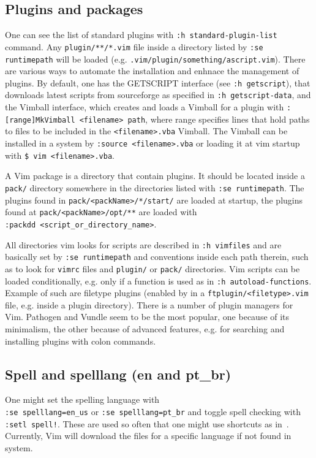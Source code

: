 \documentclass{article}
\newcommand{\tttt}[1]{\texttt{#1}}
\begin{document}
\subsection{Plugins and packages}
One can see the list of standard plugins
with \tttt{:h standard-plugin-list} command.
Any \tttt{plugin/**/*.vim} file inside a directory
listed by \tttt{:se runtimepath} will be loaded
(e.g. \tttt{.vim/plugin/something/ascript.vim}).
There are various ways to automate the installation
and enhnace the management of plugins.
By default, one has the GETSCRIPT interface (see \tttt{:h getscript}),
that downloads latest scripts from sourceforge as specified in \tttt{:h getscript-data},
and the Vimball interface, which creates and loads a Vimball for a plugin
with \tttt{:[range]MkVimball <filename> path}, where range specifies lines
that hold paths to files to be included in the \tttt{<filename>.vba} Vimball.
The Vimball can be installed in a system by \tttt{:source <filename>.vba}
or loading it at vim startup with \tttt{\$ vim <filename>.vba}.

A Vim package is a directory that contain plugins.
It should be located inside a \tttt{pack/} directory
somewhere in the directories listed with \tttt{:se runtimepath}.
The plugins found in \tttt{pack/<packName>/*/start/} are loaded
at startup, the plugins found at
\tttt{pack/<packName>/opt/**} are loaded with\\
\tttt{:packdd <script\_or\_directory\_name>}.

All directories vim looks for scripts are described
in \tttt{:h vimfiles} and are basically set by
\tttt{:se runtimepath} and conventions inside
each path therein, such as to look for \tttt{vimrc} files
and \tttt{plugin/} or \tttt{pack/} directories.
Vim scripts can be loaded conditionally,
e.g. only if a function is used as in \tttt{:h autoload-functions}.
Example of such are filetype plugins (enabled by in a \tttt{ftplugin/<filetype>.vim} file,
e.g. inside a plugin directory).
There is a number of plugin managers for Vim.
Pathogen and Vundle seem to be the most popular,
one because of its minimalism, the other because of
advanced features, e.g. for searching and installing plugins with
colon commands.

\subsection{Spell and spelllang (en and pt\_br)}
One might set the spelling language with\\ \tttt{:se spelllang=en\_us}
or \tttt{:se spelllang=pt\_br}
and toggle spell checking with \tttt{:setl spell!}.
These are used so often that one might use shortcuts as in~\cite{vimrc}.
Currently, Vim will download the files for a specific language if
not found in system.
\end{document}
